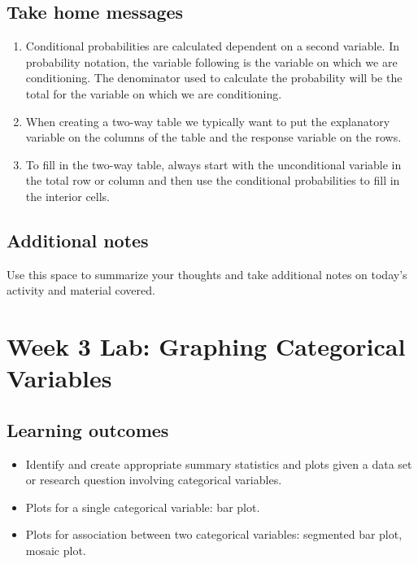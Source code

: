 \documentclass[
]{report}
\begin{document}
\newpage

\hypertarget{take-home-messages-3}{%
\subsection{Take home messages}\label{take-home-messages-3}}

\begin{enumerate}
\def\labelenumi{\arabic{enumi}.}
\item
  Conditional probabilities are calculated dependent on a second variable. In probability notation, the variable following \texttt{\textbar{}} is the variable on which we are conditioning. The denominator used to calculate the probability will be the total for the variable on which we are conditioning.
\item
  When creating a two-way table we typically want to put the explanatory variable on the columns of the table and the response variable on the rows.
\item
  To fill in the two-way table, always start with the unconditional variable in the total row or column and then use the conditional probabilities to fill in the interior cells.
\end{enumerate}

\hypertarget{additional-notes-2}{%
\subsection{Additional notes}\label{additional-notes-2}}

Use this space to summarize your thoughts and take additional notes on today's activity and material covered.

\newpage

\hypertarget{week-3-lab-graphing-categorical-variables}{%
\section{Week 3 Lab: Graphing Categorical Variables}\label{week-3-lab-graphing-categorical-variables}}


\hypertarget{learning-outcomes-6}{%
\subsection{Learning outcomes}\label{learning-outcomes-6}}

\begin{itemize}
\item
  Identify and create appropriate summary statistics and plots given a data set or research question involving categorical variables.
\item
  Plots for a single categorical variable: bar plot.
\item
  Plots for association between two categorical variables:
  segmented bar plot, mosaic plot.
\end{itemize}
\end{document}
